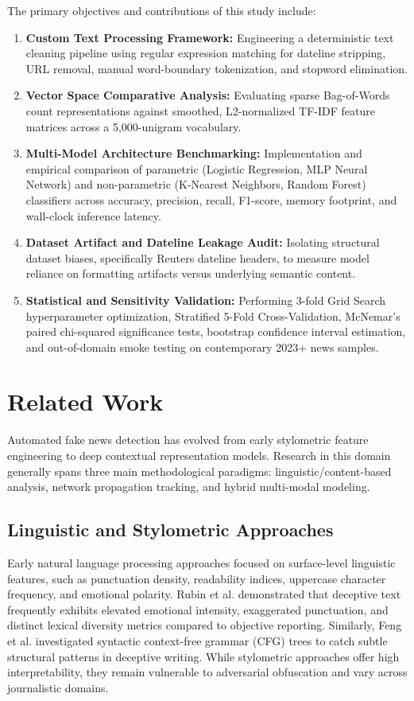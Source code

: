 \documentclass[conference]{IEEEtran}
\begin{document}
The primary objectives and contributions of this study include:
\begin{enumerate}
    \item \textbf{Custom Text Processing Framework:} Engineering a deterministic text cleaning pipeline using regular expression matching for dateline stripping, URL removal, manual word-boundary tokenization, and stopword elimination.
    \item \textbf{Vector Space Comparative Analysis:} Evaluating sparse Bag-of-Words count representations against smoothed, L2-normalized TF-IDF feature matrices across a 5,000-unigram vocabulary.
    \item \textbf{Multi-Model Architecture Benchmarking:} Implementation and empirical comparison of parametric (Logistic Regression, MLP Neural Network) and non-parametric (K-Nearest Neighbors, Random Forest) classifiers across accuracy, precision, recall, F1-score, memory footprint, and wall-clock inference latency.
    \item \textbf{Dataset Artifact and Dateline Leakage Audit:} Isolating structural dataset biases, specifically Reuters dateline headers, to measure model reliance on formatting artifacts versus underlying semantic content.
    \item \textbf{Statistical and Sensitivity Validation:} Performing 3-fold Grid Search hyperparameter optimization, Stratified 5-Fold Cross-Validation, McNemar's paired chi-squared significance tests, bootstrap confidence interval estimation, and out-of-domain smoke testing on contemporary 2023+ news samples.
\end{enumerate}

\section{Related Work}
Automated fake news detection has evolved from early stylometric feature engineering to deep contextual representation models. Research in this domain generally spans three main methodological paradigms: linguistic/content-based analysis, network propagation tracking, and hybrid multi-modal modeling.

\subsection{Linguistic and Stylometric Approaches}
Early natural language processing approaches focused on surface-level linguistic features, such as punctuation density, readability indices, uppercase character frequency, and emotional polarity. Rubin et al. \cite{rubin2015} demonstrated that deceptive text frequently exhibits elevated emotional intensity, exaggerated punctuation, and distinct lexical diversity metrics compared to objective reporting. Similarly, Feng et al. \cite{feng2012} investigated syntactic context-free grammar (CFG) trees to catch subtle structural patterns in deceptive writing. While stylometric approaches offer high interpretability, they remain vulnerable to adversarial obfuscation and vary across journalistic domains.
\end{document}
